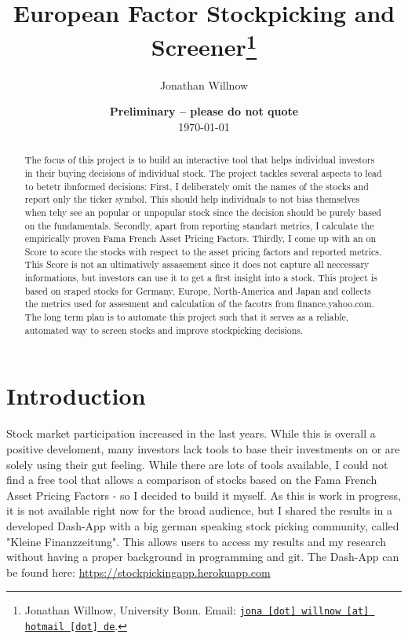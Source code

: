 \documentclass[11pt, a4paper, leqno]{article}
\begin{document}
\title{European Factor Stockpicking and Screener\thanks{Jonathan Willnow, University Bonn. Email: \href{mailto:jona.willnow@hotmail.de}{\nolinkurl{jona [dot] willnow [at] hotmail [dot] de}}.}}

\author{Jonathan Willnow}

\date{
    {\bf Preliminary -- please do not quote}
    \\[1ex]
    \today
}

\maketitle


\begin{abstract}
    The focus of this project is to build an interactive tool that helps individual investors in their buying decisions of individual stock. 
    The project tackles several aspects to lead to betetr ibnformed decisions: First, I deliberately omit the names of the stocks and report only the ticker symbol.
    This should help individuals to not bias themselves when tehy see an popular or unpopular stock since the decision should be purely based on the fundamentals.
    Secondly, apart from reporting standart metrics, I calculate the empirically proven Fama French Asset Pricing Factors. Thirdly, I come up with an on Score to score the stocks
    with respect to the asset pricing factors and reported metrics. This Score is not an ultimatively assasement since it does not capture all neccessary informations, 
    but investors can use it to get a first insight into a stock.
    This project is based on sraped stocks for Germany, Europe, North-America and Japan and collects the metrics used for assesment and calculation of the facotrs
    from finance.yahoo.com. The long term plan is to automate this project such that it serves as a reliable, automated way to screen stocks and improve stockpicking decisions.
\end{abstract}
\clearpage

\section{Introduction} %
\label{sec:introduction}
Stock market participation increased in the last years. While this is overall a positive develoment, many investors lack tools to base their investments on or are solely using their
gut feeling. While there are lots of tools available, I could not find a free tool that allows a comparison of stocks based on the Fama French Asset Pricing Factors - so I 
decided to build it myself. As this is work in progress, it is not available right now for the broad audience, but I shared the results in a developed Dash-App with a big german speaking 
stock picking community, called "Kleine Finanzzeitung". This allows users to access my results and my research without having a proper background in programming and git.
The Dash-App can be found here: \url{https://stockpickingapp.herokuapp.com}
\end{document}
